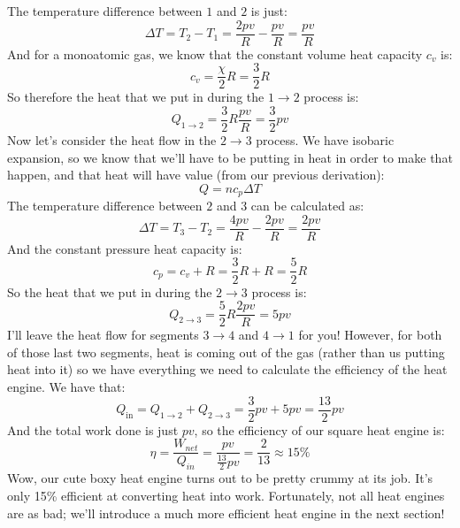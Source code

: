 The temperature difference between $1$ and $2$ is just:
\[\Delta T = T_2 -T_1 = \frac{2pv}{R} - \frac{pv}{R} = \frac{pv}{R} \] 
And for a monoatomic gas, we know that the constant volume heat capacity $c_v$ is:
\[ c_v = \frac{\chi}{2}R = \frac{3}{2}R \]
So therefore the heat that we put in during the $1 \rightarrow 2$ process is:
\[Q_{1\rightarrow 2} = \frac{3}{2}R\frac{pv}{R} = \frac{3}{2}pv \]
Now let's consider the heat flow in the $2 \rightarrow 3$ process. We have isobaric expansion, so we know that we'll have to be putting in heat in order to make that happen, and that heat will have value (from our previous derivation):
\[Q = nc_p\Delta T\]
The temperature difference between $2$ and $3$ can be calculated as:
\[\Delta T = T_3 -T_2 = \frac{4pv}{R} - \frac{2pv}{R} = \frac{2pv}{R} \] 
And the constant pressure heat capacity is:
\[c_p = c_v + R = \frac{3}{2}R + R = \frac{5}{2}R \]
So the heat that we put in during the $2 \rightarrow 3$ process is:
\[Q_{2\rightarrow 3} = \frac{5}{2}R\frac{2pv}{R} = 5pv \]
I'll leave the heat flow for segments $3 \rightarrow 4$ and $4 \rightarrow 1$ for you! However, for both of those last two segments, heat is coming out of the gas (rather than us putting heat into it) so we have everything we need to calculate the efficiency of the heat engine. We have that:
\[Q_{\text{in}} = Q_{1 \rightarrow 2} + Q_{2 \rightarrow 3} = \frac{3}{2}pv + 5pv = \frac{13}{2}pv \]
And the total work done is just $pv$, so the efficiency of our square heat engine is:
\[ \eta = \frac{W_{net}}{Q_{in}} = \frac{pv}{\frac{13}{2}pv} = \frac{2}{13} \approx 15 \% \]
Wow, our cute boxy heat engine turns out to be pretty crummy at its job. It's only 15\% efficient at converting heat into work. Fortunately, not all heat engines are as bad; we'll introduce a much more efficient heat engine in the next section!

